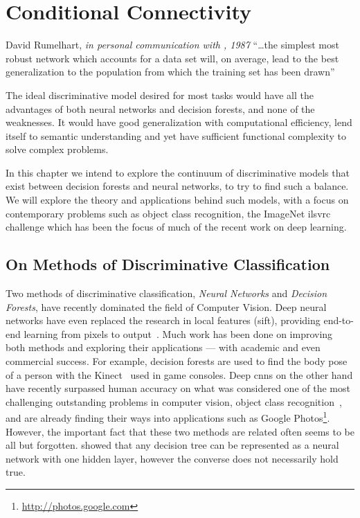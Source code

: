 \documentclass[thesis]{subfiles}
\begin{document}
	\chapter{Conditional Connectivity}\label{conditionalnetworks}
	\begin{chapquote}{David Rumelhart, \textit{in personal communication with \citeauthor{hanson1989comparing}, 1987}}
		``\ldots the simplest most robust network which accounts for a data set will, on average, lead to the best generalization to the population from which the training set has been drawn''
	\end{chapquote}
	
	The ideal discriminative model desired for most tasks would have all the advantages of both neural networks and decision forests, and none of the weaknesses. It would have good generalization with computational efficiency, lend itself to semantic understanding and yet have sufficient functional complexity to solve complex problems. 
	
	In this chapter we intend to explore the continuum of discriminative models that exist between decision forests and neural networks, to try to find such a balance. We will explore the theory and applications behind such models, with a focus on contemporary problems such as object class recognition, \ie the ImageNet \gls{ilsvrc} challenge which has been the focus of much of the recent work on deep learning.
	
	\section{On Methods of Discriminative Classification}
	Two methods of discriminative classification, \emph{Neural Networks} and \emph{Decision Forests}, have recently dominated the field of Computer Vision. Deep neural networks have even replaced the research in local features (\eg \gls{sift}), providing end-to-end learning from pixels to output~\citep{yi2016lift}. Much work has been done on improving both methods and exploring their applications --- with academic and even commercial success. For example, decision forests are used to find the body pose of a person with the Kinect~\citep{conf/cvpr/ShottonFCSFMKB11} used in game consoles. Deep \glspl{cnn} on the other hand have recently surpassed human accuracy on what was considered one of the most challenging outstanding problems in computer vision, object class recognition~\citep{He2015b}, and are already finding their ways into applications such as Google Photos\footnote{\href{http://photos.google.com}{http://photos.google.com}}. However, the important fact that these two methods are related often seems to be all but forgotten. \citet{Sethi1990} showed that any decision tree can be represented as a neural network with one hidden layer, however the converse does not necessarily hold true.
	
\end{document}
